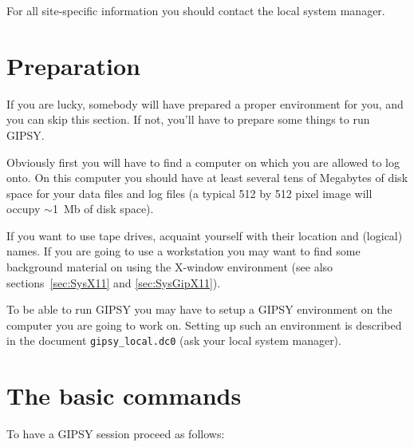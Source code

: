 For all site-specific information you should contact the local system manager.

\section{Preparation}

  If you are lucky, somebody will have prepared a proper environment
for you, and you can skip this section. If not, you'll
have to prepare some things to run GIPSY.

  Obviously first you will have to find a computer on which you are
allowed to log onto.  On this computer you should have at least several
tens of Megabytes of disk space for your data files and log files
(a typical 512 by 512 pixel image will occupy $\sim$1~Mb of disk space).

  If you want to use tape drives, acquaint yourself with their
location and (logical) names.  If you are going to use a workstation
you may want to find some background material on using the X-window
environment (see also sections~\ref{sec:SysX11} and \ref{sec:SysGipX11}). 

  To be able to run GIPSY you may have to setup a GIPSY environment on
the computer you are going to work on. Setting up such an environment
is described in the document {\tt gipsy\_local.dc0} (ask your
local system manager).

\section{The basic commands}
\label{sec:GoBasics}

To have a GIPSY session proceed as follows:


